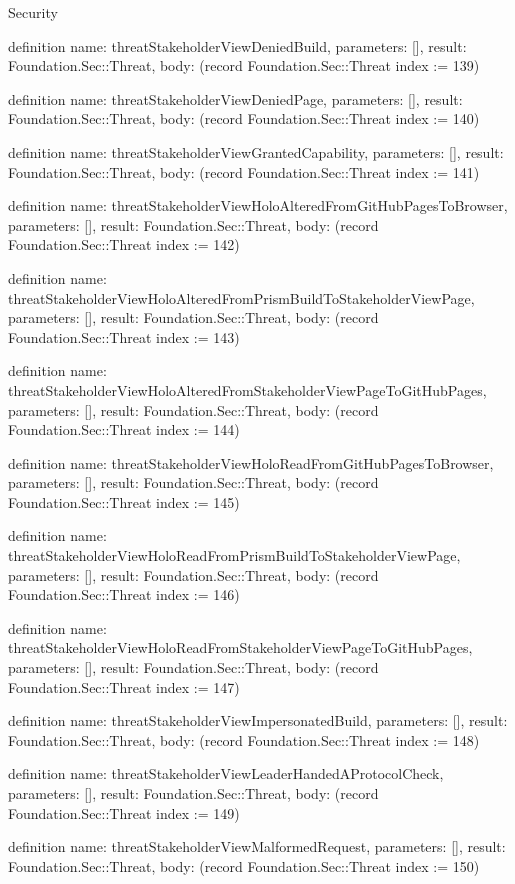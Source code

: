 \begin{lexlean}{Security}
\begin{semanticmodule}
definition{
  name: threatStakeholderViewDeniedBuild,
  parameters: [],
  result: Foundation.Sec::Threat,
  body: (record Foundation.Sec::Threat {index := 139})
}

definition{
  name: threatStakeholderViewDeniedPage,
  parameters: [],
  result: Foundation.Sec::Threat,
  body: (record Foundation.Sec::Threat {index := 140})
}

definition{
  name: threatStakeholderViewGrantedCapability,
  parameters: [],
  result: Foundation.Sec::Threat,
  body: (record Foundation.Sec::Threat {index := 141})
}

definition{
  name: threatStakeholderViewHoloAlteredFromGitHubPagesToBrowser,
  parameters: [],
  result: Foundation.Sec::Threat,
  body: (record Foundation.Sec::Threat {index := 142})
}

definition{
  name: threatStakeholderViewHoloAlteredFromPrismBuildToStakeholderViewPage,
  parameters: [],
  result: Foundation.Sec::Threat,
  body: (record Foundation.Sec::Threat {index := 143})
}

definition{
  name: threatStakeholderViewHoloAlteredFromStakeholderViewPageToGitHubPages,
  parameters: [],
  result: Foundation.Sec::Threat,
  body: (record Foundation.Sec::Threat {index := 144})
}

definition{
  name: threatStakeholderViewHoloReadFromGitHubPagesToBrowser,
  parameters: [],
  result: Foundation.Sec::Threat,
  body: (record Foundation.Sec::Threat {index := 145})
}

definition{
  name: threatStakeholderViewHoloReadFromPrismBuildToStakeholderViewPage,
  parameters: [],
  result: Foundation.Sec::Threat,
  body: (record Foundation.Sec::Threat {index := 146})
}

definition{
  name: threatStakeholderViewHoloReadFromStakeholderViewPageToGitHubPages,
  parameters: [],
  result: Foundation.Sec::Threat,
  body: (record Foundation.Sec::Threat {index := 147})
}

definition{
  name: threatStakeholderViewImpersonatedBuild,
  parameters: [],
  result: Foundation.Sec::Threat,
  body: (record Foundation.Sec::Threat {index := 148})
}

definition{
  name: threatStakeholderViewLeaderHandedAProtocolCheck,
  parameters: [],
  result: Foundation.Sec::Threat,
  body: (record Foundation.Sec::Threat {index := 149})
}

definition{
  name: threatStakeholderViewMalformedRequest,
  parameters: [],
  result: Foundation.Sec::Threat,
  body: (record Foundation.Sec::Threat {index := 150})
}


\end{semanticmodule}
\end{lexlean}
